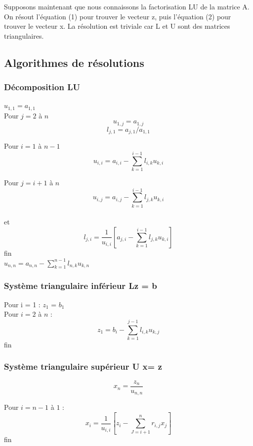 \documentclass[a4paper,12pt]{report}
\begin{document}
Supposons maintenant que nous connaissons la factorisation LU de la
matrice A. On résout l'équation (1) pour trouver le vecteur z, puis l'équation (2) pour trouver le vecteur x. La résolution est triviale car L et U sont des matrices triangulaires.\\

\subsection{Algorithmes de résolutions}

\subsubsection {Décomposition LU}

$u_{1,1} = a_{1,1}$\\

Pour $j = 2$ à $n$\\
	$$u_{1,j} = a_{1,j}$$
	$$l_{j,1} = a_{j,1}/a_{1,1}$$
	
Pour $i=1$ à $n-1$\\
$$u_{i,i} = a_{i,i} - \displaystyle\sum_{k=1}^{i-1} l_{i,k}u_{k,i}$$

Pour $j = i+1$ à $n$
$$u_{i,j} = a_{i,j} - \displaystyle\sum_{k=1}^{i-1} l_{j,k}u_{k,i}$$\\
et $$l_{j,i} = \dfrac{1}{u_{i,i}}\left[ a_{j,i}- \displaystyle\sum_{k=1}^{i-1} l_{j,k}u_{k,i}\right]$$	
fin
\\

$u_{n,n} = a_{n,n} - \displaystyle\sum_{k=1}^{n-1} l_{n,k}u_{k,n}$\\

\subsubsection {Système triangulaire inférieur Lz = b} 

Pour i = 1 : $z_1$ = $b_1$\\

Pour $i=2$ à $n$ :
$$z_{1} = b_{i} - \displaystyle\sum_{k=1}^{j-1} l_{i,k}u_{k,j}$$
fin\\

\subsubsection {Système triangulaire supérieur U x= z}
$$x_{n} = \dfrac{z_{n}}{u_{n,n}}$$

Pour $i=n-1$ à $1$ :
$$x_{i} = \dfrac{1}{u_{i,i}}\left[ z_{i}- \displaystyle\sum_{J=i+1}^{n} r_{i,j}x_{j}\right]$$
fin\\
\end{document}
